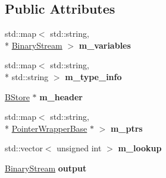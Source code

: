 \subsection*{Public Attributes}
\begin{DoxyCompactItemize}
\item 
\hypertarget{classBStore_a0f4fd24bea02af560942cc3e7f7c7a14}{std\-::map$<$ std\-::string, \\*
\hyperlink{classBinaryStream}{Binary\-Stream} $>$ {\bfseries m\-\_\-variables}}\label{classBStore_a0f4fd24bea02af560942cc3e7f7c7a14}

\item 
\hypertarget{classBStore_aca288cf958c9c253f0d83186bbf328e4}{std\-::map$<$ std\-::string, \\*
std\-::string $>$ {\bfseries m\-\_\-type\-\_\-info}}\label{classBStore_aca288cf958c9c253f0d83186bbf328e4}

\item 
\hypertarget{classBStore_aac68d5979f4e6221809bd66f8a11de7a}{\hyperlink{classBStore}{B\-Store} $\ast$ {\bfseries m\-\_\-header}}\label{classBStore_aac68d5979f4e6221809bd66f8a11de7a}

\item 
\hypertarget{classBStore_aa8c1c4320ff4d9083c82c4183fe738a8}{std\-::map$<$ std\-::string, \\*
\hyperlink{classPointerWrapperBase}{Pointer\-Wrapper\-Base} $\ast$ $>$ {\bfseries m\-\_\-ptrs}}\label{classBStore_aa8c1c4320ff4d9083c82c4183fe738a8}

\item 
\hypertarget{classBStore_af5d947d571aa325b566db6dfd52cd54c}{std\-::vector$<$ unsigned int $>$ {\bfseries m\-\_\-lookup}}\label{classBStore_af5d947d571aa325b566db6dfd52cd54c}

\item 
\hypertarget{classBStore_a0d3b08dfb9aa0147a14f14d853655371}{\hyperlink{classBinaryStream}{Binary\-Stream} {\bfseries output}}\label{classBStore_a0d3b08dfb9aa0147a14f14d853655371}

\end{DoxyCompactItemize}


